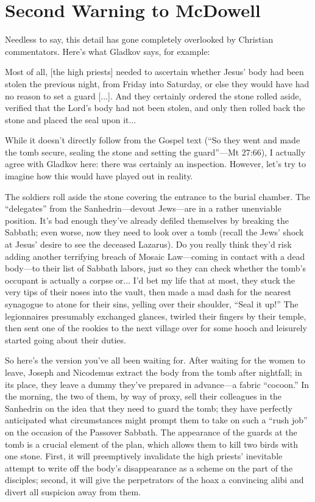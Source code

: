 \chapter*[(Yellow Card)]{Second Warning to McDowell}


Needless to say, this detail has gone completely overlooked by Christian commentators. Here's what Gladkov says, for example:

\begin{smallquote}
    Most of all, [the high priests] needed to ascertain whether Jesus' body had been stolen the previous night, from Friday into Saturday, or else they would have had no reason to set a guard [...]. And they certainly ordered the stone rolled aside, verified that the Lord's body had not been stolen, and only then rolled back the stone and placed the seal upon it...
\end{smallquote}
While it doesn't directly follow from the Gospel text (``So they went and made the tomb secure, sealing the stone and setting the guard''---Mt 27:66), I actually agree with Gladkov here: there was certainly an inspection. However, let's try to imagine how this would have played out in reality.

The soldiers roll aside the stone covering the entrance to the burial chamber. The ``delegates'' from the Sanhedrin---devout Jews---are in a rather unenviable position. It's bad enough they've already defiled themselves by breaking the Sabbath; even worse, now they need to look over a tomb (recall the Jews' shock at Jesus' desire to see the deceased Lazarus). Do you really think they'd risk adding another terrifying breach of Mosaic Law---coming in contact with a dead body---to their list of Sabbath labors, just so they can check whether the tomb's occupant is actually a corpse or...  I'd bet my life that at most, they stuck the very tips of their noses into the vault, then made a mad dash for the nearest synagogue to atone for their sins, yelling over their shoulder, ``Seal it up!'' The legionnaires presumably exchanged glances, twirled their fingers by their temple, then sent one of the rookies to the next village over for some hooch and leisurely started going about their duties.

So here's the version you've all been waiting for. After waiting for the women to leave, Joseph and Nicodemus extract the body from the tomb after nightfall; in its place, they leave a dummy they've prepared in advance---a fabric ``cocoon.'' In the morning, the two of them, by way of proxy, sell their colleagues in the Sanhedrin on the idea that they need to guard the tomb; they have perfectly anticipated what circumstances might prompt them to take on such a ``rush job'' on the occasion of the Passover Sabbath. The appearance of the guards at the tomb is a crucial element of the plan, which allows them to kill two birds with one stone. First, it will preemptively invalidate the high priests' inevitable attempt to write off the body's disappearance as a scheme on the part of the disciples; second, it will give the perpetrators of the hoax a convincing alibi and divert all suspicion away from them.


